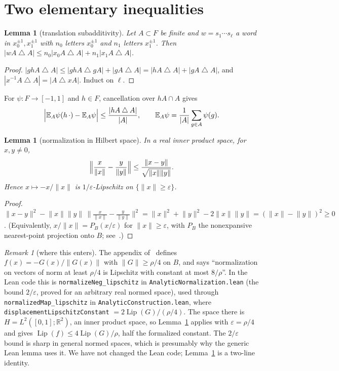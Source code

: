 \documentclass[11pt]{article}
\newtheorem{lemma}[theorem]{Lemma}
\theoremstyle{definition}
\theoremstyle{remark}
\newtheorem{remark}[theorem]{Remark}
\newcommand{\norm}[1]{\lVert #1\rVert}
\newcommand{\E}{\mathbb{E}}
\newcommand{\R}{\mathbb{R}}
\newcommand{\Lip}{\operatorname{Lip}}
\newcommand{\sd}{\mathbin{\triangle}}
\begin{document}
\section{Two elementary inequalities}

\begin{lemma}[translation subadditivity]\label{lem:sub}
Let $A\subset F$ be finite and $w=s_1\cdots s_\ell$ a word in $x_0^{\pm1},x_1^{\pm1}$ with $n_0$
letters $x_0^{\pm1}$ and $n_1$ letters $x_1^{\pm1}$. Then
$|wA\sd A|\le n_0|x_0A\sd A|+n_1|x_1A\sd A|$.
\end{lemma}
\begin{proof}
$|ghA\sd A|\le|ghA\sd gA|+|gA\sd A|=|hA\sd A|+|gA\sd A|$, and $|x^{-1}A\sd A|=|A\sd xA|$.
Induct on $\ell$.
\end{proof}

For $\psi:F\to[-1,1]$ and $h\in F$, cancellation over $hA\cap A$ gives \cite[\S2.3]{OAI}
\begin{equation}\label{eq:transl}
  \Bigl|\E_A\psi(h\,\cdot)-\E_A\psi\Bigr|\le\frac{|hA\sd A|}{|A|},\qquad
  \E_A\psi=\frac1{|A|}\sum_{g\in A}\psi(g).
\end{equation}

\begin{lemma}[normalization in Hilbert space]\label{lem:norm}
In a real inner product space, for $x,y\neq0$,
\[
 \Bigl\|\frac{x}{\norm x}-\frac{y}{\norm y}\Bigr\|\le\frac{\norm{x-y}}{\sqrt{\norm x\norm y}} .
\]
Hence $x\mapsto -x/\norm x$ is $1/\varepsilon$-Lipschitz on $\{\norm x\ge\varepsilon\}$.
\end{lemma}
\begin{proof}
$\norm{x-y}^2-\norm x\norm y\,\bigl\|\tfrac{x}{\norm x}-\tfrac{y}{\norm y}\bigr\|^2
=\norm x^2+\norm y^2-2\norm x\norm y=(\norm x-\norm y)^2\ge0$.
(Equivalently, $x/\norm x=P_B(x/\varepsilon)$ for $\norm x\ge\varepsilon$, with $P_B$ the
nonexpansive nearest-point projection onto $B$; see~\cite{CGT}.)
\end{proof}

\begin{remark}[where this enters]\label{rem:where}
The appendix of~\cite{OAI} defines $f(x)=-G(x)/\norm{G(x)}$ with $\norm{G}\ge\rho/4$ on $B$, and
says ``normalization on vectors of norm at least $\rho/4$ is Lipschitz with constant at most
$8/\rho$''. In the Lean code this is \texttt{normalizeNeg\_lipschitz} in
\texttt{AnalyticNormalization.lean} (the bound $2/\varepsilon$, proved for an arbitrary real normed
space), used through \texttt{normalizedMap\_lipschitz} in \texttt{AnalyticConstruction.lean}, where
\texttt{displacementLipschitzConstant} $=2\Lip(G)/(\rho/4)$. The space there is
$H=L^2([0,1];\R^2)$, an inner product space, so Lemma~\ref{lem:norm} applies with
$\varepsilon=\rho/4$ and gives $\Lip(f)\le4\Lip(G)/\rho$, half the formalized constant. The
$2/\varepsilon$ bound is sharp in general normed spaces, which is presumably why the generic Lean
lemma uses it. We have not changed the Lean code; Lemma~\ref{lem:norm} is a two-line identity.
\end{remark}
\end{document}

